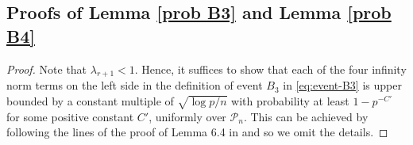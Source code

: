 \documentclass[11pt]{article}
\newcommand{\nb}[1]{\textcolor{orange}{\texttt{[#1]}}}
\newcommand{\gsc}[1]{\textcolor{blue}{\texttt{[#1]}}}
\newcommand{\0}{{\mathbf{0}}}
\newcommand{\op}{{\mathrm{op}}}
\newcommand{\tA}{{\widetilde{A}}}
\newcommand{\tB}{{\widetilde{B}}}
\newtheorem{corollary}[theorem]{Corollary}
\begin{document}
\iffalse
By a similar argument, we have the following Corollary on the perturbation of generalized eigenspace. \nb{decide whether to state it in the paper later.}
\begin{corollary}
Denote $X_1,X_2$ to be the leading and complementing generalized eigenspace for matrix pair $(A,B)$. Similarly, Denote $\tilde{X}_1,\tilde{X}_2$ to be the leading and complementing generalized eigenspace for matrix pair $(\tA,\tB)=(A+E,B+F)$. Suppose $A,B$ are both symmetric and positive definite. Define \begin{equation*}
\Delta = B^{-1/2}AB^{-1/2}-\tB^{-1/2}\tA\tB^{-1/2}.
\end{equation*}
Let $\lambda_i$ be the $i$th generalized eigenvalue for matrix pair $(A,B)$. Then if $\|\Delta\|_\op\leq \lambda_{r+1}\wedge\lambda_r-\lambda_{r+1}$,\gsc{Unfortunately we need this condition to hold to claim the bound, since in Generalized eigenspace the perturbation depends on $\Delta$ not $E,F$ directly} we have\begin{equation*}
\|\mathrm{sin}\Theta(\mathcal{R}(X_1),\mathcal{R}(\tilde{X}_1))\|_\mathrm{F}\leq 2\frac{\sqrt{\|A\|_\op^2+\|B\|_\op^2}}{\gamma(A,B)\gamma(\tA,\tB)}\frac{\sqrt{\|EX_1\|_\mathrm{F}^2+\|FX_1\|_\mathrm{F}^2}}{\lambda_r-\lambda_{r+1}-\|\Delta\|_\op}\sqrt{(1+\lambda_1^2)(1+\lambda_{r+1}^2)}.
\end{equation*}
\end{corollary}
\fi

\subsection{Proofs of Lemma \ref{prob B3} and Lemma \ref{prob B4}}
\begin{proof}
Note that $\lambda_{r+1} < 1$. Hence, it suffices to show that each of the four infinity norm terms on the left side in the definition of event $B_3$ in \eqref{eq:event-B3} is upper bounded by a constant multiple of $\sqrt{\log p/n}$ with probability at least $1 - p^{-C'}$ for some positive constant $C'$, {
  uniformly over $\mathcal{P}_n$}.
This can be achieved by following the lines of the proof of Lemma 6.4 in \cite{gao2017sparse} and so we omit the details.
\end{proof}
\end{document}
